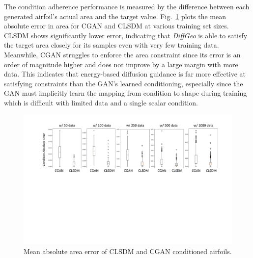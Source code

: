 The condition adherence performance is measured by the difference between each generated airfoil’s actual area and the target value. Fig.~\ref{ch6:fig:main_benchmark_condition_mae_boxplot} plots the mean absolute error in area for CGAN and CLSDM at various training set sizes. CLSDM shows significantly lower error, indicating that \textit{DiffGeo} is able to satisfy the target area closely for its samples even with very few training data. Meanwhile, CGAN struggles to enforce the area constraint since its error is an order of magnitude higher and does not improve by a large margin with more data. This indicates that energy-based diffusion guidance is far more effective at satisfying constraints than the GAN’s learned conditioning, especially since the GAN must implicitly learn the mapping from condition to shape during training which is difficult with limited data and a single scalar condition.

\begin{figure}[!t]
    \begin{center}
        \includegraphics[width=1\linewidth]{chapter6/fig/condition_mae_box_plot.pdf}
    \end{center}
    \vspace{-2mm}
    \caption{
        \small Mean absolute area error of CLSDM and CGAN conditioned airfoils.
    }
    \label{ch6:fig:main_benchmark_condition_mae_boxplot}
\end{figure}

